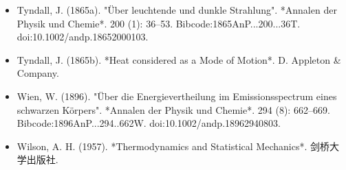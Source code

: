 \begin{itemize}
\item Tyndall, J. (1865a). "Über leuchtende und dunkle Strahlung". *Annalen der Physik und Chemie*. 200 (1): 36–53. Bibcode:1865AnP...200...36T. doi:10.1002/andp.18652000103.  
\item Tyndall, J. (1865b). *Heat considered as a Mode of Motion*. D. Appleton & Company.  
\item Wien, W. (1896). "Über die Energievertheilung im Emissionsspectrum eines schwarzen Körpers". *Annalen der Physik und Chemie*. 294 (8): 662–669. Bibcode:1896AnP...294..662W. doi:10.1002/andp.18962940803.  
\item Wilson, A. H. (1957). *Thermodynamics and Statistical Mechanics*. 剑桥大学出版社.
\end{itemize}